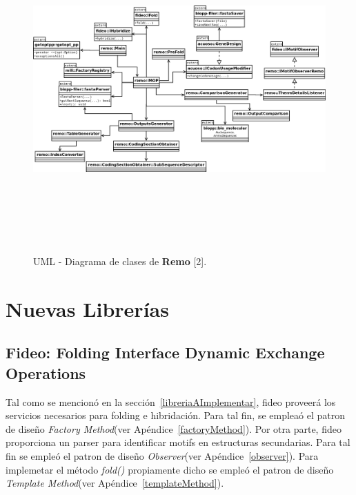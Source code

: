 \begin{figure}[!hbtp]
	\begin{center}
		\hspace*{-1.5cm}\includegraphics[width=19cm, height=12.5cm, angle=90]{image/emptyClass.png}
		\caption{UML - Diagrama de clases de \textbf{Remo} [2].}
		\label{RemoDClase1}
	\end{center}
\end{figure}

\vskip 15cm
\section{Nuevas Librerías}
\subsection{Fideo: Folding Interface Dynamic Exchange Operations}

\par Tal como se mencionó en la sección~\ref{libreriaAImplementar}, fideo proveerá los servicios necesarios para folding e hibridación. Para tal fin, se empleaó el patron de diseño \emph{Factory Method}(ver Apéndice~\ref{factoryMethod}). Por otra parte, fideo proporciona un parser para identificar motifs en estructuras secundarias. Para tal fin se empleó el patron de diseño \emph{Observer}(ver Apéndice~\ref{observer}). Para implemetar el método \emph{fold()} propiamente dicho se empleó el patron de diseño \emph{Template Method}(ver Apéndice~\ref{templateMethod}).

